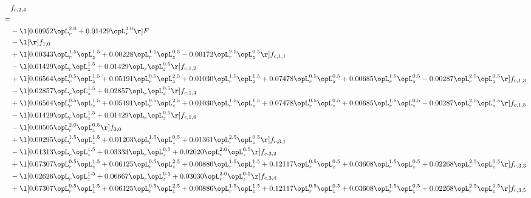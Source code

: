 \begin{alignat}{2} 
\label{eq:f_24_1} 
& f_{c,2,4} \nonumber \\ 
 = \\ 
& - \l[  0.00952 \opL_r^{2.0} +  0.01429 \opL_r^{3.0}  \r] F \nonumber \\ 
& - \l[  \r] f_{1,0} \nonumber \\ 
& + \l[  0.00343 \opL_r^{1.5} \opL_z^{1.5} +  0.00228 \opL_r^{1.5} \opL_z^{0.5}   -0.00172 \opL_r^{2.5} \opL_z^{0.5}  \r] f_{c,1,1} \nonumber \\ 
& - \l[  0.01429 \opL_r \opL_z^{1.5} +  0.01429 \opL_r \opL_z^{0.5}  \r] f_{c,1,2} \nonumber \\ 
& + \l[  0.06564 \opL_r^{0.5} \opL_z^{1.5} +  0.05191 \opL_r^{0.5} \opL_z^{2.5} +  0.01030 \opL_r^{1.5} \opL_z^{1.5} +  0.07478 \opL_r^{0.5} \opL_z^{0.5} +  0.00685 \opL_r^{1.5} \opL_z^{0.5}   -0.00287 \opL_r^{2.5} \opL_z^{0.5}  \r] f_{c,1,3} \nonumber \\ 
& - \l[  0.02857 \opL_r \opL_z^{1.5} +  0.02857 \opL_r \opL_z^{0.5}  \r] f_{c,1,4} \nonumber \\ 
& + \l[  0.06564 \opL_r^{0.5} \opL_z^{1.5} +  0.05191 \opL_r^{0.5} \opL_z^{2.5} +  0.01030 \opL_r^{1.5} \opL_z^{1.5} +  0.07478 \opL_r^{0.5} \opL_z^{0.5} +  0.00685 \opL_r^{1.5} \opL_z^{0.5}   -0.00287 \opL_r^{2.5} \opL_z^{0.5}  \r] f_{c,1,5} \nonumber \\ 
& - \l[  0.01429 \opL_r \opL_z^{1.5} +  0.01429 \opL_r \opL_z^{0.5}  \r] f_{c,1,6} \nonumber \\ 
& - \l[  0.00505 \opL_r^{2.0} \opL_z^{0.5}  \r] f_{3,0} \nonumber \\ 
& + \l[  0.00295 \opL_r^{1.5} \opL_z^{1.5} +  0.01203 \opL_r^{1.5} \opL_z^{0.5} +  0.01361 \opL_r^{2.5} \opL_z^{0.5}  \r] f_{c,3,1} \nonumber \\ 
& - \l[  0.01313 \opL_r \opL_z^{1.5} +  0.03333 \opL_r \opL_z^{0.5} +  0.02020 \opL_r^{2.0} \opL_z^{0.5}  \r] f_{c,3,2} \nonumber \\ 
& + \l[  0.07307 \opL_r^{0.5} \opL_z^{1.5} +  0.06125 \opL_r^{0.5} \opL_z^{2.5} +  0.00886 \opL_r^{1.5} \opL_z^{1.5} +  0.12117 \opL_r^{0.5} \opL_z^{0.5} +  0.03608 \opL_r^{1.5} \opL_z^{0.5} +  0.02268 \opL_r^{2.5} \opL_z^{0.5}  \r] f_{c,3,3} \nonumber \\ 
& - \l[  0.02626 \opL_r \opL_z^{1.5} +  0.06667 \opL_r \opL_z^{0.5} +  0.03030 \opL_r^{2.0} \opL_z^{0.5}  \r] f_{c,3,4} \nonumber \\ 
& + \l[  0.07307 \opL_r^{0.5} \opL_z^{1.5} +  0.06125 \opL_r^{0.5} \opL_z^{2.5} +  0.00886 \opL_r^{1.5} \opL_z^{1.5} +  0.12117 \opL_r^{0.5} \opL_z^{0.5} +  0.03608 \opL_r^{1.5} \opL_z^{0.5} +  0.02268 \opL_r^{2.5} \opL_z^{0.5}  \r] f_{c,3,5} \nonumber \\ 

\end{alignat}
